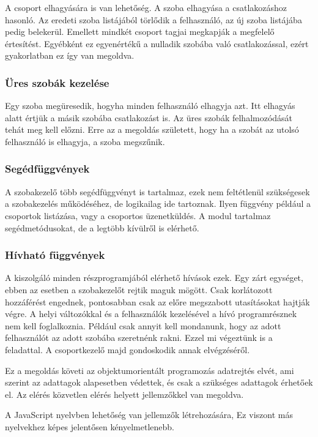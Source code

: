 \documentclass[]{article}
\begin{document}
A csoport elhagyására is van lehetőség. A szoba elhagyása a
csatlakozáshoz hasonló. Az eredeti szoba listájából törlődik a
felhasználó, az új szoba listájába pedig belekerül. Emellett mindkét
csoport tagjai megkapják a megfelelő értesítést. Egyébként ez
egyenértékű a nulladik szobába való csatlakozással, ezért gyakorlatban
ez így van megoldva.


\subsubsection{Üres szobák
kezelése}

Egy szoba megüresedik, hogyha minden felhasználó elhagyja azt. Itt
elhagyás alatt értjük a másik szobába csatlakozást is. Az üres szobák
felhalmozódását tehát meg kell előzni. Erre az a megoldás született,
hogy ha a szobát az utolsó felhasználó is elhagyja, a szoba megszűnik.


\subsubsection{Segédfüggvények}

A szobakezelő több segédfüggvényt is tartalmaz, ezek nem feltétlenül
szükségesek a szobakezelés működéséhez, de logikailag ide tartoznak.
Ilyen függvény például a csoportok listázása, vagy a csoportos
üzenetküldés. A modul tartalmaz segédmetódusokat, de a legtöbb kívülről
is elérhető.


\subsubsection{Hívható
függvények}

A kiszolgáló minden részprogramjából elérhető hívások ezek. Egy zárt
egységet, ebben az esetben a szobakezelőt rejtik maguk mögött. Csak
korlátozott hozzáférést engednek, pontosabban csak az előre megszabott
utasításokat hajtják végre. A helyi változókkal és a felhasználók
kezelésével a hívó programrésznek nem kell foglalkoznia. Például csak
annyit kell mondanunk, hogy az adott felhasználót az adott szobába
szeretnénk rakni. Ezzel mi végeztünk is a feladattal. A csoportkezelő
majd gondoskodik annak elvégzéséről.

Ez a megoldás követi az objektumorientált programozás adatrejtés elvét,
ami szerint az adattagok alapesetben védettek, és csak a szükséges
adattagok érhetőek el. Az elérés közvetlen elérés helyett jellemzőkkel
van megoldva.

A JavaScript nyelvben lehetőség van jellemzők létrehozására, Ez viszont
más nyelvekhez képes jelentősen kényelmetlenebb.
\end{document}

